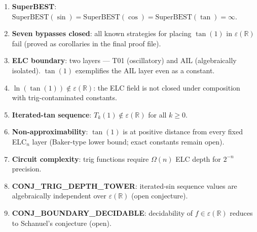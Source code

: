 \documentclass[11pt]{article}
\begin{document}
\begin{enumerate}
  \item \textbf{SuperBEST}: $\mathrm{SuperBEST}(\sin)=\mathrm{SuperBEST}(\cos)=\mathrm{SuperBEST}(\tan)=\infty$.
  \item \textbf{Seven bypasses closed}: all known strategies for placing $\tan(1)$
    in $\varepsilon(\mathbb{R})$ fail (proved as corollaries in the final proof file).
  \item \textbf{ELC boundary}: two layers --- T01 (oscillatory) and AIL (algebraically isolated).
    $\tan(1)$ exemplifies the AIL layer even as a constant.
  \item \textbf{$\ln(\tan(1))\notin\varepsilon(\mathbb{R})$}: the ELC field is not closed
    under composition with trig-contaminated constants.
  \item \textbf{Iterated-tan sequence}: $T_k(1)\notin\varepsilon(\mathbb{R})$ for all $k\geq0$.
  \item \textbf{Non-approximability}: $\tan(1)$ is at positive distance from every fixed ELC$_n$ layer
    (Baker-type lower bound; exact constants remain open).
  \item \textbf{Circuit complexity}: trig functions require $\Omega(n)$ ELC depth for $2^{-n}$ precision.
  \item \textbf{CONJ\_TRIG\_DEPTH\_TOWER}: iterated-sin sequence values are algebraically independent
    over $\varepsilon(\mathbb{R})$ (open conjecture).
  \item \textbf{CONJ\_BOUNDARY\_DECIDABLE}: decidability of $f\in\varepsilon(\mathbb{R})$ reduces
    to Schanuel's conjecture (open).
\end{enumerate}
\end{document}
